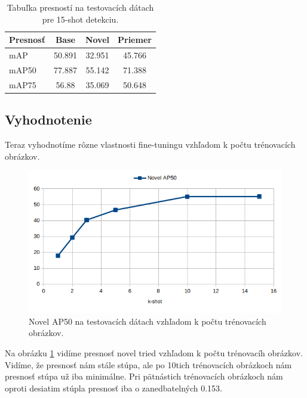 \begin{table}[H]
\begin{tabular}{|l|c|c|c|}
\hline
\textbf{Presnosť} & \textbf{Base} & \textbf{Novel} & \textbf{Priemer} \\
\hline
mAP & 50.891 & 32.951 & 45.766 \\
mAP50 & 77.887 & 55.142 & 71.388 \\
mAP75 & 56.88 & 35.069 & 50.648 \\
\hline
\end{tabular}
\centering
\caption{Tabuľka presností na testovacích dátach pre 15-shot detekciu.}
\label{tab:table6}
\end{table}

\subsection{Vyhodnotenie}

Teraz vyhodnotíme rôzne vlastnosti fine-tuningu vzhľadom k počtu trénovacích obrázkov. 

\begin{figure}[H]
\includegraphics[width=\textwidth]{images/results_novel_AP50.png}
\centering
\caption{Novel AP50 na testovacích dátach vzhľadom k počtu trénovacích obrázkov.}
\label{fig:image37}
\end{figure}

Na obrázku \ref{fig:image37} vidíme presnosť novel tried vzhľadom k počtu trénovacíh obrázkov. Vidíme, že presnosť nám stále stúpa, ale po 10tich trénovacích obrázkoch nám presnosť stúpa už iba minimálne. Pri pätnástich trénovacích obrázkoch nám oproti desiatim stúpla presnosť iba o zanedbatelných 0.153.

